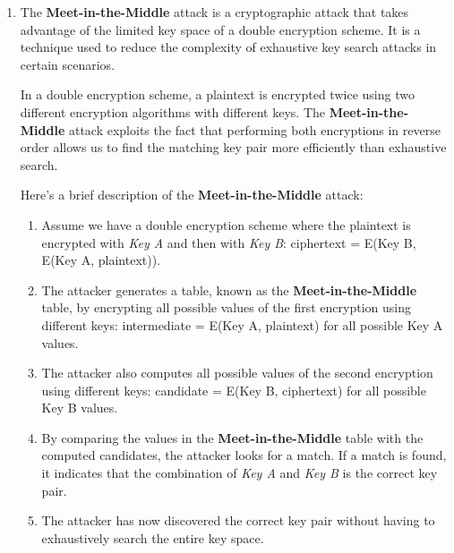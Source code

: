 {\begin{enumerate}
\begin{itemize}
			\item \textbf{Loss of Perfect Secrecy}: Reusing the keystream violates perfect secrecy, which is achieved when each key is used only once. The introduction of patterns and relationships makes it possible to gain information about the plaintext, compromising its security.
		\end{itemize}
	
		\item The \textbf{Meet-in-the-Middle} attack is a cryptographic attack that takes advantage of the limited key space of a double encryption scheme. It is a technique used to reduce the complexity of exhaustive key search attacks in certain scenarios.
		
		In a double encryption scheme, a plaintext is encrypted twice using two different encryption algorithms with different keys. The \textbf{Meet-in-the-Middle} attack exploits the fact that performing both encryptions in reverse order allows us to find the matching key pair more efficiently than exhaustive search.
		
		Here's a brief description of the \textbf{Meet-in-the-Middle} attack:
		
		\begin{enumerate}
			\item Assume we have a double encryption scheme where the plaintext is encrypted with \textit{Key A} and then with \textit{Key B}: ciphertext = E(Key B, E(Key A, plaintext)).
			
			\item The attacker generates a table, known as the \textbf{Meet-in-the-Middle} table, by encrypting all possible values of the first encryption using different keys: intermediate = E(Key A, plaintext) for all possible Key A values.
			
			\item The attacker also computes all possible values of the second encryption using different keys: candidate = E(Key B, ciphertext) for all possible Key B values.
			
			\item By comparing the values in the \textbf{Meet-in-the-Middle} table with the computed candidates, the attacker looks for a match. If a match is found, it indicates that the combination of \textit{Key A} and \textit{Key B} is the correct key pair.
			
			\item The attacker has now discovered the correct key pair without having to exhaustively search the entire key space.
		\end{enumerate}
		

\end{enumerate}}
